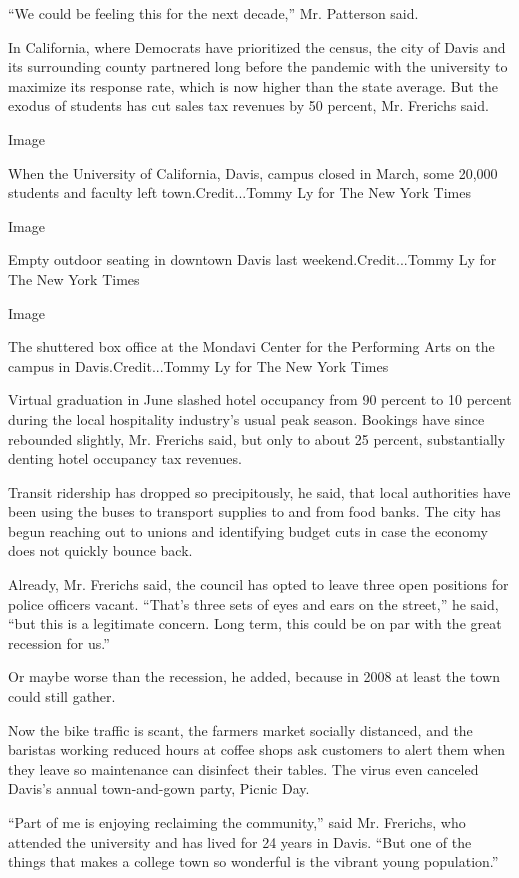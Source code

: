 ``We could be feeling this for the next decade,'' Mr. Patterson said.

In California, where Democrats have prioritized the census, the city of
Davis and its surrounding county partnered long before the pandemic with
the university to maximize its response rate, which is now higher than
the state average. But the exodus of students has cut sales tax revenues
by 50 percent, Mr. Frerichs said.

Image

When the University of California, Davis, campus closed in March, some
20,000 students and faculty left town.Credit...Tommy Ly for The New York
Times

Image

Empty outdoor seating in downtown Davis last weekend.Credit...Tommy Ly
for The New York Times

Image

The shuttered box office at the Mondavi Center for the Performing Arts
on the campus in Davis.Credit...Tommy Ly for The New York Times

Virtual graduation in June slashed hotel occupancy from 90 percent to 10
percent during the local hospitality industry's usual peak season.
Bookings have since rebounded slightly, Mr. Frerichs said, but only to
about 25 percent, substantially denting hotel occupancy tax revenues.

Transit ridership has dropped so precipitously, he said, that local
authorities have been using the buses to transport supplies to and from
food banks. The city has begun reaching out to unions and identifying
budget cuts in case the economy does not quickly bounce back.

Already, Mr. Frerichs said, the council has opted to leave three open
positions for police officers vacant. ``That's three sets of eyes and
ears on the street,'' he said, ``but this is a legitimate concern. Long
term, this could be on par with the great recession for us.''

Or maybe worse than the recession, he added, because in 2008 at least
the town could still gather.

Now the bike traffic is scant, the farmers market socially distanced,
and the baristas working reduced hours at coffee shops ask customers to
alert them when they leave so maintenance can disinfect their tables.
The virus even canceled Davis's annual town-and-gown party, Picnic Day.

``Part of me is enjoying reclaiming the community,'' said Mr. Frerichs,
who attended the university and has lived for 24 years in Davis. ``But
one of the things that makes a college town so wonderful is the vibrant
young population.''

